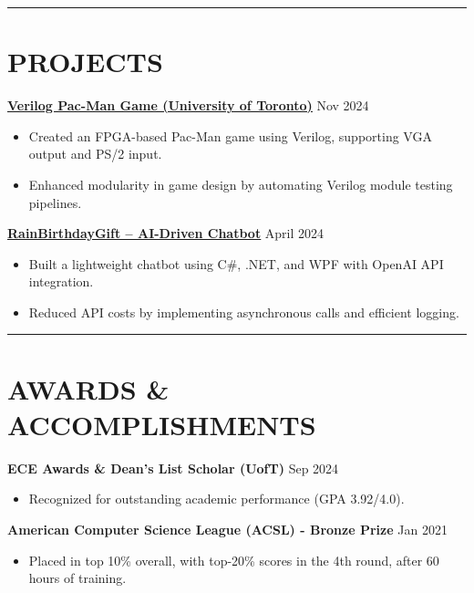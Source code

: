 \documentclass[a4paper,10pt]{article}
\begin{document}
\noindent\rule{\linewidth}{1pt}

\section*{\textbf{PROJECTS}}

\noindent\href{https://github.com/Ken-2511/ECE241-Project}{\uline{
\textbf{Verilog Pac-Man Game (University of Toronto)}}} \hfill Nov 2024
\begin{itemize}[leftmargin=0.2in]
    \item Created an FPGA-based Pac-Man game using Verilog, supporting VGA output and PS/2 input.
    \item Enhanced modularity in game design by automating Verilog module testing pipelines.
\end{itemize}

\vspace{0.3cm}
\noindent\href{https://github.com/Ken-2511/RainBirthdayGift}{\uline{
\textbf{RainBirthdayGift – AI-Driven Chatbot}}} \hfill April 2024
\begin{itemize}[leftmargin=0.2in]
    \item Built a lightweight chatbot using C\#, .NET, and WPF with OpenAI API integration.
    \item Reduced API costs by implementing asynchronous calls and efficient logging.
\end{itemize}

\noindent\rule{\linewidth}{1pt}

\section*{\textbf{AWARDS \& ACCOMPLISHMENTS}}

\noindent\textbf{ECE Awards \& Dean's List Scholar (UofT)} \hfill Sep 2024
\begin{itemize}[leftmargin=0.2in]
    \item Recognized for outstanding academic performance (GPA 3.92/4.0).
\end{itemize}

\vspace{0.3cm}
\noindent\textbf{American Computer Science League (ACSL) - Bronze Prize} \hfill Jan 2021
\begin{itemize}[leftmargin=0.2in]
    \item Placed in top 10\% overall, with top-20\% scores in the 4th round, after 60 hours of training.
\end{itemize}
\end{document}
